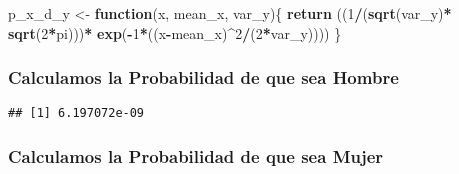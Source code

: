 \documentclass[]{article}
\newenvironment{Shaded}{\begin{snugshade}}{\end{snugshade}}
\newcommand{\KeywordTok}[1]{\textcolor[rgb]{0.13,0.29,0.53}{\textbf{#1}}}
\newcommand{\DecValTok}[1]{\textcolor[rgb]{0.00,0.00,0.81}{#1}}
\newcommand{\StringTok}[1]{\textcolor[rgb]{0.31,0.60,0.02}{#1}}
\newcommand{\ControlFlowTok}[1]{\textcolor[rgb]{0.13,0.29,0.53}{\textbf{#1}}}
\newcommand{\OperatorTok}[1]{\textcolor[rgb]{0.81,0.36,0.00}{\textbf{#1}}}
\newcommand{\NormalTok}[1]{#1}
\begin{document}
\begin{Shaded}
\begin{Highlighting}[]
\NormalTok{p_x_d_y <-}\StringTok{ }\ControlFlowTok{function}\NormalTok{(x, mean_x, var_y)\{}
  \KeywordTok{return}\NormalTok{ ((}\DecValTok{1}\OperatorTok{/}\NormalTok{(}\KeywordTok{sqrt}\NormalTok{(var_y)}\OperatorTok{*}\StringTok{ }\KeywordTok{sqrt}\NormalTok{(}\DecValTok{2}\OperatorTok{*}\NormalTok{pi)))}\OperatorTok{*}\StringTok{ }\KeywordTok{exp}\NormalTok{(}\OperatorTok{-}\DecValTok{1}\OperatorTok{*}\NormalTok{((x}\OperatorTok{-}\NormalTok{mean_x)}\OperatorTok{^}\DecValTok{2}\OperatorTok{/}\NormalTok{(}\DecValTok{2}\OperatorTok{*}\NormalTok{var_y))))}
\NormalTok{\}}
\end{Highlighting}
\end{Shaded}

\subsubsection{Calculamos la Probabilidad de que sea
Hombre}\label{calculamos-la-probabilidad-de-que-sea-hombre}

\begin{Shaded}
\end{Shaded}

\begin{verbatim}
## [1] 6.197072e-09
\end{verbatim}

\subsubsection{Calculamos la Probabilidad de que sea
Mujer}\label{calculamos-la-probabilidad-de-que-sea-mujer}
\end{document}
